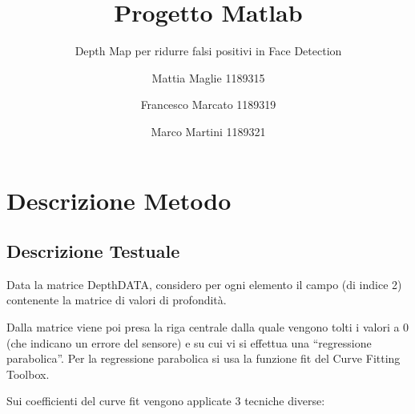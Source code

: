 \documentclass[
  italian,
]{article}
\title{Progetto Matlab}
\subtitle{Depth Map per ridurre falsi positivi in Face Detection}
\author{Mattia Maglie 1189315 \and Francesco Marcato 1189319 \and Marco
Martini 1189321}
\date{}
\begin{document}
\maketitle

\hypertarget{descrizione-metodo}{%
\section{Descrizione Metodo}\label{descrizione-metodo}}

\hypertarget{descrizione-testuale}{%
\subsection{Descrizione Testuale}\label{descrizione-testuale}}

Data la matrice DepthDATA, considero per ogni elemento il campo (di
indice 2) contenente la matrice di valori di profondità.

Dalla matrice viene poi presa la riga centrale dalla quale vengono tolti i valori a 0 (che indicano un errore del sensore) e su cui vi si effettua
una ``regressione parabolica''. Per la
regressione parabolica si usa la funzione fit del Curve Fitting Toolbox.

Sui coefficienti del curve fit vengono applicate 3 tecniche diverse:
\end{document}
